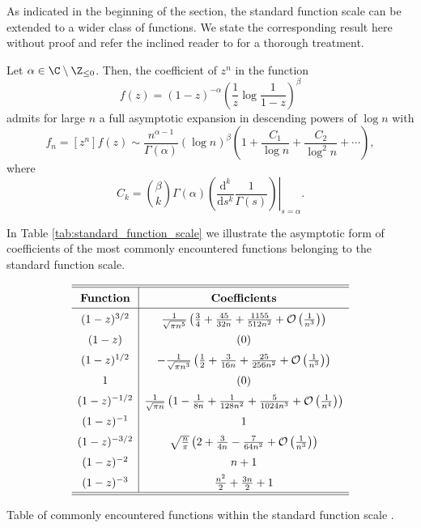 As indicated in the beginning of the section, the standard function scale can be extended to a wider class of functions. We state the corresponding result here without proof and refer the inclined reader to \cite{SingularityAnalysis} for a thorough treatment.

\begin{theorem}
  Let $\alpha \in \C \setminus \Z_{\leq 0}$. Then, the coefficient of $z^n$ in the function
  $$
    f(z) = (1 - z)^{-\alpha} \left(\frac{1}{z} \log \frac{1}{1-z}\right)^\beta
  $$
  admits for large $n$ a full asymptotic expansion in descending powers of $\log n$ with
  $$
    f_n = [z^n] f(z) \sim \frac{n^{\alpha - 1}}{\Gamma(\alpha)}(\log n)^\beta \left(1 + \frac{C_1}{\log n} + \frac{C_2}{\log^2 n} + \cdots\right),
  $$
  where
  $$
    C_k = \binom{\beta}{k} \Gamma(\alpha) \left.\left(\frac{\mathrm{d}^k}{\mathrm{d}s^k} \frac{1}{\Gamma(s)}\right)\right|_{s = \alpha}.
  $$
\end{theorem}

In Table \ref{tab:standard_function_scale} we illustrate the asymptotic form of coefficients of the most commonly encountered functions belonging to the standard function scale.

\begin{table}[hbt!]
  \centering
  \[\def\arraystretch{1.5}
  \begin{array}{c|c}
    \hline
    \hline
    \textbf{Function} & \textbf{Coefficients} \\ \hline
    (1 - z)^{3/2} & \frac{1}{\sqrt{\pi n^{5}}}
    \left(
      \frac{3}{4} + \frac{45}{32n} + \frac{1155}{512n^{2}} + \mathcal{O}\left(\frac{1}{n^{3}}\right)
    \right)  \\
    (1 - z) & (0) \\ 
    (1 - z)^{1/2} & - \frac{1}{\sqrt{\pi n^{3}}}\left(\frac{1}{2} + \frac{3}{16n} + \frac{25}{256n^{2}} + \mathcal{O}\left(\frac{1}{n^{3}}\right)\right) \\
    1 & (0) \\
    (1 - z)^{-1/2} & \frac{1}{\sqrt{\pi n}}\left(1 - \frac{1}{8n} + \frac{1}{128n^{2}} + \frac{5}{1024n^{3}} + \mathcal{O}\left(\frac{1}{n^{4}}\right)\right) \\
    (1 - z)^{-1} & 1 \\
    (1 - z)^{-3/2} & \sqrt{\frac{n}{\pi}}\left(2 + \frac{3}{4n}- \frac{7}{64n^{2}} + \mathcal{O}\left(\frac{1}{n^{3}}\right)\right) \\
    (1 - z)^{-2} & n + 1 \\
    (1 - z)^{-3} & \frac{n^2}{2} + \frac{3n}{2} + 1 \\
    \hline
    \hline
  \end{array}
  \]
  \caption[Table of standard function scale.]{Table of commonly encountered functions within the standard function scale \cite[Figure VI.5, p.~388]{AnalyticCombinatorics}.}
  \label{tab:standard_function_scale}
\end{table}

